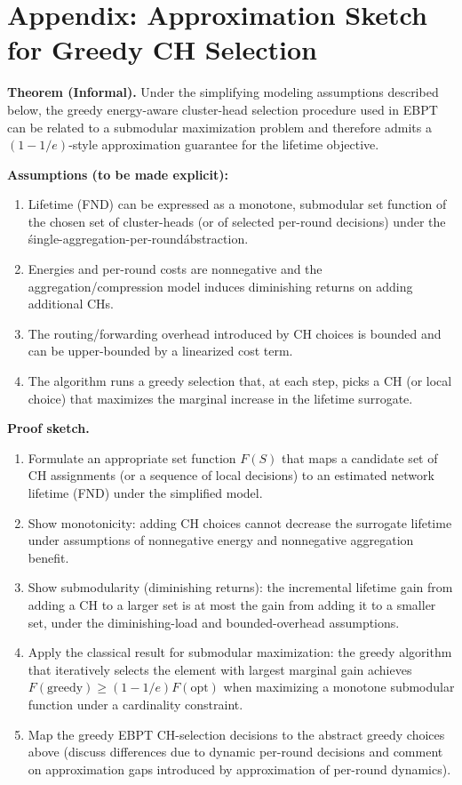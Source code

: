\section*{Appendix: Approximation Sketch for Greedy CH Selection}

\textbf{Theorem (Informal).} Under the simplifying modeling assumptions described below, the greedy energy-aware cluster-head selection procedure used in EBPT can be related to a submodular maximization problem and therefore admits a $(1 - 1/e)$-style approximation guarantee for the lifetime objective.

\textbf{Assumptions (to be made explicit):}
\begin{enumerate}
  \item Lifetime (FND) can be expressed as a monotone, submodular set function of the chosen set of cluster-heads (or of selected per-round decisions) under the \'single-aggregation-per-round\' abstraction.
  \item Energies and per-round costs are nonnegative and the aggregation/compression model induces diminishing returns on adding additional CHs.
  \item The routing/forwarding overhead introduced by CH choices is bounded and can be upper-bounded by a linearized cost term.
  \item The algorithm runs a greedy selection that, at each step, picks a CH (or local choice) that maximizes the marginal increase in the lifetime surrogate.
\end{enumerate}

\textbf{Proof sketch.}
\begin{enumerate}
  \item Formulate an appropriate set function $F(S)$ that maps a candidate set of CH assignments (or a sequence of local decisions) to an estimated network lifetime (FND) under the simplified model.
  \item Show monotonicity: adding CH choices cannot decrease the surrogate lifetime under assumptions of nonnegative energy and nonnegative aggregation benefit.
  \item Show submodularity (diminishing returns): the incremental lifetime gain from adding a CH to a larger set is at most the gain from adding it to a smaller set, under the diminishing-load and bounded-overhead assumptions.
  \item Apply the classical result for submodular maximization: the greedy algorithm that iteratively selects the element with largest marginal gain achieves $F(\text{greedy}) \ge (1 - 1/e) F(\text{opt})$ when maximizing a monotone submodular function under a cardinality constraint.
  \item Map the greedy EBPT CH-selection decisions to the abstract greedy choices above (discuss differences due to dynamic per-round decisions and comment on approximation gaps introduced by approximation of per-round dynamics).
\end{enumerate}

